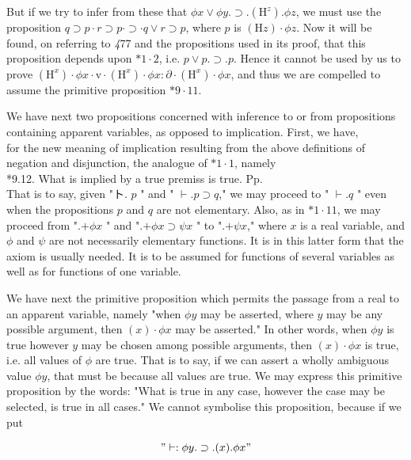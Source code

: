 \documentclass[10pt]{article}
\begin{document}
But if we try to infer from these that $\phi x \vee \phi y . \supset .\left(\mathrm{H}^{z}\right) . \phi z$, we must use the proposition $q \supset p \cdot r \supset p \cdot \supset \cdot q \vee r \supset p$, where $p$ is $(\mathrm{H} z) \cdot \phi z$. Now it will be found, on referring to \textit{4}77 and the propositions used in its proof, that this proposition depends upon $* 1 \cdot 2$, i.e. $p \vee p . \supset . p$. Hence it cannot be used by us to prove $\left(\mathrm{H}^{x}\right) \cdot \phi x \cdot \mathrm{v} \cdot\left(\mathrm{H}^{x}\right) \cdot \phi x: \partial \cdot\left(\mathrm{H}^{x}\right) \cdot \phi x$, and thus we are compelled to assume the primitive proposition $* 9 \cdot 11$.

We have next two propositions concerned with inference to or from propositions containing apparent variables, as opposed to implication. First, we have,\\
for the new meaning of implication resulting from the above definitions of negation and disjunction, the analogue of $* 1 \cdot 1$, namely\\
*9.12. What is implied by a true premiss is true. Pp.\\
That is to say, given "ト. $p$ " and " $\vdash . p \supset q$," we may proceed to " $\vdash . q$ " even when the propositions $p$ and $q$ are not elementary. Also, as in $* 1 \cdot 11$, we may proceed from ".$+ \phi x$ " and ".$+ \phi x \supset \psi x$ " to ".$+ \psi x$," where $x$ is a real variable, and $\phi$ and $\psi$ are not necessarily elementary functions. It is in this latter form that the axiom is usually needed. It is to be assumed for functions of several variables as well as for functions of one variable.

We have next the primitive proposition which permits the passage from a real to an apparent variable, namely "when $\phi y$ may be asserted, where $y$ may be any possible argument, then $(x) \cdot \phi x$ may be asserted." In other words, when $\phi y$ is true however $y$ may be chosen among possible arguments, then $(x) \cdot \phi x$ is true, i.e. all values of $\phi$ are true. That is to say, if we can assert a wholly ambiguous value $\phi y$, that must be because all values are true. We may express this primitive proposition by the words: "What is true in any case, however the case may be selected, is true in all cases." We cannot symbolise this proposition, because if we put

$$
" \vdash: \phi y . \supset .(x) . \phi x "
$$
\end{document}
